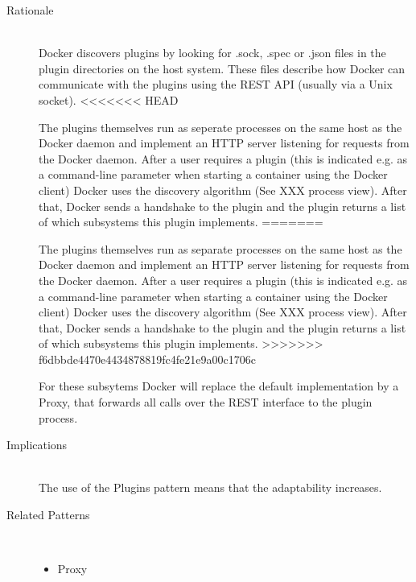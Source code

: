 \begin{description}
\item [Rationale] ~\\ %
Docker discovers plugins by looking for .sock, .spec or .json files in the plugin directories on the host system. These files describe how Docker can communicate with the plugins using the REST API (usually via a Unix socket).
<<<<<<< HEAD


The plugins themselves run as seperate processes on the same host as the Docker daemon and implement an HTTP server listening for requests from the Docker daemon. After a user requires a plugin (this is indicated e.g. as a command-line parameter when starting a container using the Docker client) Docker uses the discovery algorithm (See XXX process view). After that, Docker sends a handshake to the plugin and the plugin returns a list of which subsystems this plugin implements.  %
=======

The plugins themselves run as separate processes on the same host as the Docker daemon and implement an HTTP server listening for requests from the Docker daemon. After a user requires a plugin (this is indicated e.g. as a command-line parameter when starting a container using the Docker client) Docker uses the discovery algorithm (See XXX process view). After that, Docker sends a handshake to the plugin and the plugin returns a list of which subsystems this plugin implements.
>>>>>>> f6dbbde4470e4434878819fc4fe21e9a00c1706c

For these subsytems Docker will replace the default implementation by a Proxy, that forwards all calls over the REST interface to the plugin process.

\item [Implications]~\\
The use of the Plugins pattern means that the adaptability increases. 

\item [Related Patterns]~
\begin{itemize}
\item Proxy
\end{itemize}

\end{description}

